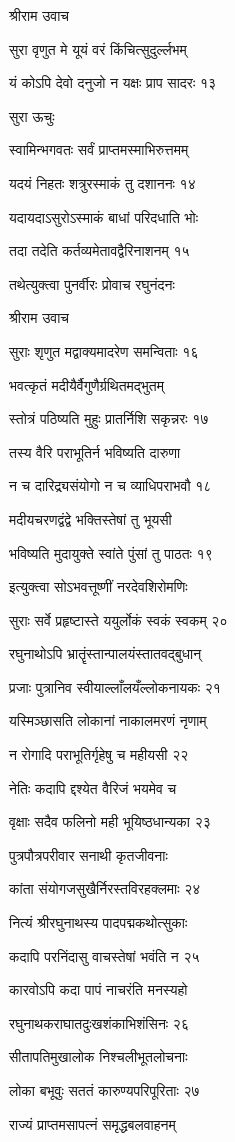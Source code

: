 श्रीराम उवाच

सुरा वृणुत मे यूयं वरं किंचित्सुदुर्ल्लभम्

यं कोऽपि देवो दनुजो न यक्षः प्राप सादरः १३

सुरा ऊचुः

स्वामिन्भगवतः सर्वं प्राप्तमस्माभिरुत्तमम्

यदयं निहतः शत्रुरस्माकं तु दशाननः १४

यदायदाऽसुरोऽस्माकं बाधां परिदधाति भोः

तदा तदेति कर्तव्यमेतावद्वैरिनाशनम् १५

तथेत्युक्त्वा पुनर्वीरः प्रोवाच रघुनंदनः

श्रीराम उवाच

सुराः शृणुत मद्वाक्यमादरेण समन्विताः १६

भवत्कृतं मदीयैर्वैगुणैर्ग्रथितमद्भुतम्

स्तोत्रं पठिष्यति मुहुः प्रातर्निशि सकृन्नरः १७

तस्य वैरि पराभूतिर्न भविष्यति दारुणा

न च दारिद्र्यसंयोगो न च व्याधिपराभवौ १८

मदीयचरणद्वंद्वे भक्तिस्तेषां तु भूयसी

भविष्यति मुदायुक्ते स्वांते पुंसां तु पाठतः १९

इत्युक्त्वा सोऽभवत्तूष्णीं नरदेवशिरोमणिः

सुराः सर्वे प्रहृष्टास्ते ययुर्लोकं स्वकं स्वकम् २०

रघुनाथोऽपि भ्रातॄंस्तान्पालयंस्तातवद्बुधान्

प्रजाः पुत्रानिव स्वीयाल्लाँलयँल्लोकनायकः २१

यस्मिञ्छासति लोकानां नाकालमरणं नृणाम्

न रोगादि पराभूतिर्गृहेषु च महीयसी २२

नेतिः कदापि द्दश्येत वैरिजं भयमेव च

वृक्षाः सदैव फलिनो मही भूयिष्ठधान्यका २३

पुत्रपौत्रपरीवार सनाथी कृतजीवनाः

कांता संयोगजसुखैर्निरस्तविरहक्लमाः २४

नित्यं श्रीरघुनाथस्य पादपद्मकथोत्सुकाः

कदापि परनिंदासु वाचस्तेषां भवंति न २५

कारवोऽपि कदा पापं नाचरंति मनस्यहो

रघुनाथकराघातदुःखशंकाभिशंसिनः २६

सीतापतिमुखालोक निश्चलीभूतलोचनाः

लोका बभूवुः सततं कारुण्यपरिपूरिताः २७

राज्यं प्राप्तमसापत्नं समृद्धबलवाहनम्

